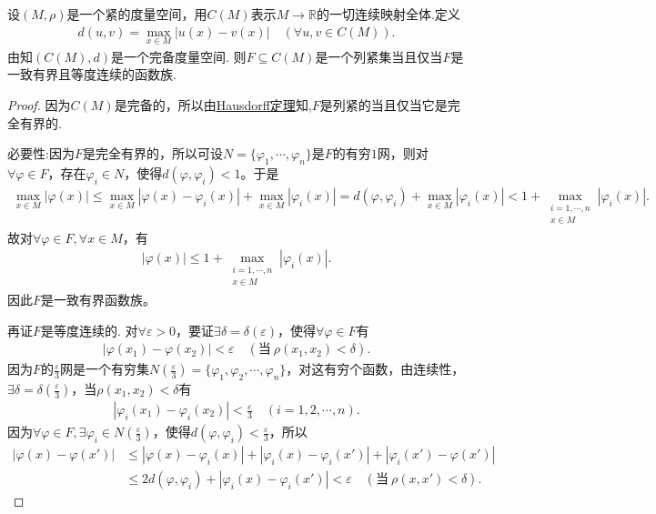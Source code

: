 \documentclass[../../main.tex]{subfiles}%
\begin{document}
\begin{theorem}\label{theorem:泛函分析--Arzelà-Ascoli定理}
设$(M,\rho)$是一个紧的度量空间，用$C(M)$表示$M\to\mathbb{R}$的一切连续映射全体.定义
\begin{align*}
d(u,v)=\max\limits_{x\in M}|u(x)-v(x)|\quad (\forall u,v\in C(M)).
\end{align*}
由知$(C(M),d)$是一个完备度量空间.
则$F\subseteq C(M)$是一个列紧集当且仅当$F$是一致有界且等度连续的函数族.
\end{theorem}
\begin{proof}
因为$C(M)$是完备的，所以由\hyperref[theorem:泛函分析--Hausdorff定理]{Hausdorff定理}知,$F$是列紧的当且仅当它是完全有界的.

{\heiti 必要性:}因为$F$是完全有界的，所以可设$N=\{\varphi_1,\cdots,\varphi_n\}$是$F$的有穷$1$网，则对$\forall \varphi \in F$，存在$\varphi_i\in N$，使得$d(\varphi,\varphi_i)<1$。于是
\begin{align*}
\max\limits_{x\in M}|\varphi(x)|\leqslant\max\limits_{x\in M}|\varphi(x)-\varphi_i(x)|+\max\limits_{x\in M}|\varphi_i(x)|=d(\varphi,\varphi_i)+\max\limits_{x\in M}|\varphi_i(x)|<1+\max\limits_{\substack{i=1,\cdots,n\\x\in M}} |\varphi_i(x)|.
\end{align*}
故对$\forall \varphi \in F,\forall x\in M$，有
\begin{align*}
|\varphi(x)|\leqslant 1+\max\limits_{\substack{i=1,\cdots,n\\x\in M}} |\varphi_i(x)|.
\end{align*}
因此$F$是一致有界函数族。

再证$F$是等度连续的.
对$\forall\varepsilon>0$，要证$\exists\delta=\delta(\varepsilon)$，使得$\forall\varphi\in F$有
\begin{align*}
|\varphi(x_1)-\varphi(x_2)|<\varepsilon\quad (\text{当}\ \rho(x_1,x_2)<\delta).
\end{align*}
因为$F$的$\frac{\varepsilon}{3}$网是一个有穷集$N(\frac{\varepsilon}{3})=\{\varphi_1,\varphi_2,\cdots,\varphi_n\}$，对这有穷个函数，由连续性，$\exists\delta=\delta(\frac{\varepsilon}{3})$，当$\rho(x_1,x_2)<\delta$有
\begin{align*}
|\varphi_i(x_1)-\varphi_i(x_2)|<\frac{\varepsilon}{3}\quad (i=1,2,\cdots,n).
\end{align*}
因为$\forall\varphi\in F,\exists\varphi_i\in N(\frac{\varepsilon}{3})$，使得$d(\varphi,\varphi_i)<\frac{\varepsilon}{3}$，所以
\begin{align*}
|\varphi(x)-\varphi(x')|&\leqslant|\varphi(x)-\varphi_i(x)|+|\varphi_i(x)-\varphi_i(x')|+|\varphi_i(x')-\varphi(x')| \\
&\leqslant 2d(\varphi,\varphi_i)+|\varphi_i(x)-\varphi_i(x')|<\varepsilon\quad (\text{当}\ \rho(x,x')<\delta).
\end{align*}


\end{proof}
\end{document}
